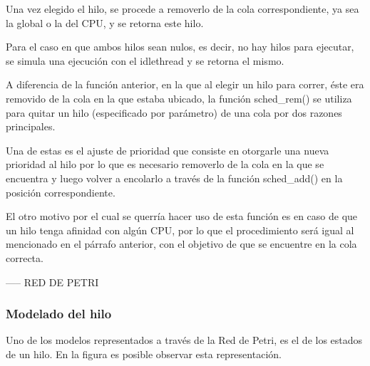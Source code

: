 Una vez elegido el hilo, se procede a removerlo de la cola correspondiente, ya sea la global o la del CPU, y se retorna este hilo.

Para el caso en que ambos hilos sean nulos, es decir, no hay hilos para ejecutar, se simula una ejecución con el idlethread y se retorna el mismo.

A diferencia de la función anterior, en la que al elegir un hilo para correr, éste era removido de la cola en la que estaba ubicado, la función sched\_rem() se utiliza para quitar un hilo (especificado por parámetro) de una cola por dos razones principales.\par

Una de estas es el ajuste de prioridad que consiste en otorgarle una nueva prioridad al hilo por lo que es necesario removerlo de la cola en la que se encuentra y luego volver a encolarlo a través de la función sched\_add() en la posición correspondiente.\par

El otro motivo por el cual se querría hacer uso de esta función es en caso de que un hilo tenga afinidad con algún CPU, por lo que el procedimiento será igual al mencionado en el párrafo anterior, con el objetivo de que se encuentre en la cola correcta.\par


----- RED DE PETRI

\subsubsection{Modelado del hilo}
Uno de los modelos representados a través de la Red de Petri, es el de los estados de un hilo. En la figura es posible observar esta representación.\par


